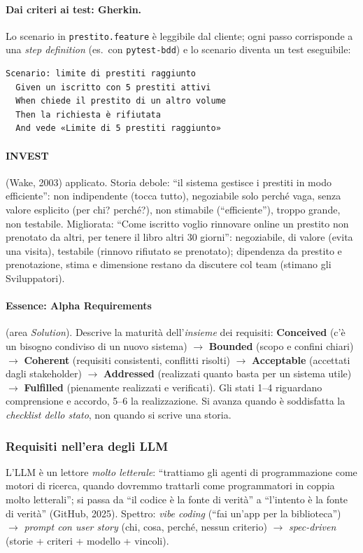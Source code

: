 \documentclass[a4paper,12pt]{article}
\begin{document}
\paragraph{Dai criteri ai test: Gherkin.} Lo scenario in \texttt{prestito.feature} è
leggibile dal cliente; ogni passo corrisponde a una \emph{step definition} (es.\ con
\texttt{pytest-bdd}) e lo scenario diventa un test eseguibile:
\begin{verbatim}
Scenario: limite di prestiti raggiunto
  Given un iscritto con 5 prestiti attivi
  When chiede il prestito di un altro volume
  Then la richiesta è rifiutata
  And vede «Limite di 5 prestiti raggiunto»
\end{verbatim}

\paragraph{INVEST} (Wake, 2003) applicato. Storia debole: ``il sistema gestisce i prestiti
in modo efficiente'': non indipendente (tocca tutto), negoziabile solo perché vaga, senza
valore esplicito (per chi? perché?), non stimabile (``efficiente''), troppo grande, non
testabile. Migliorata: ``Come iscritto voglio rinnovare online un prestito non prenotato da
altri, per tenere il libro altri 30 giorni'': negoziabile, di valore (evita una visita),
testabile (rinnovo rifiutato se prenotato); dipendenza da prestito e prenotazione, stima e
dimensione restano da discutere col team (stimano gli Sviluppatori).

\paragraph{Essence: Alpha Requirements} (area \emph{Solution}). Descrive la maturità
dell'\emph{insieme} dei requisiti: \textbf{Conceived} (c'è un bisogno condiviso di un nuovo
sistema) $\to$ \textbf{Bounded} (scopo e confini chiari) $\to$ \textbf{Coherent} (requisiti
consistenti, conflitti risolti) $\to$ \textbf{Acceptable} (accettati dagli stakeholder)
$\to$ \textbf{Addressed} (realizzati quanto basta per un sistema utile) $\to$
\textbf{Fulfilled} (pienamente realizzati e verificati). Gli stati 1--4 riguardano
comprensione e accordo, 5--6 la realizzazione. Si avanza quando è soddisfatta la
\emph{checklist dello stato}, non quando si scrive una storia.

\subsubsection{Requisiti nell'era degli LLM}
L'LLM è un lettore \emph{molto letterale}: ``trattiamo gli agenti di programmazione come
motori di ricerca, quando dovremmo trattarli come programmatori in coppia molto letterali'';
si passa da ``il codice è la fonte di verità'' a ``l'intento è la fonte di verità'' (GitHub,
2025). Spettro: \emph{vibe coding} (``fai un'app per la biblioteca'') $\to$ \emph{prompt con
user story} (chi, cosa, perché, nessun criterio) $\to$ \emph{spec-driven} (storie + criteri
+ modello + vincoli).
\end{document}
